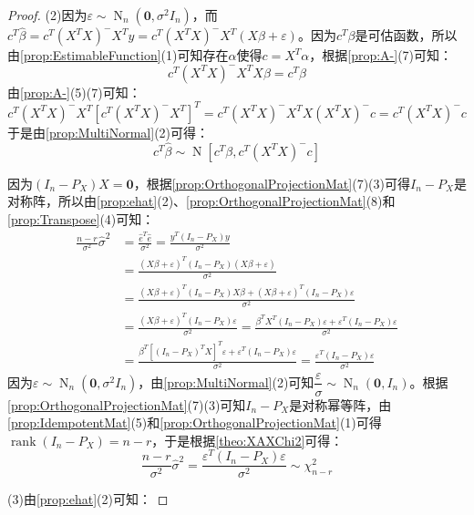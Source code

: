 \begin{proof}
	(2)因为$\varepsilon\sim\operatorname{N}_n(\mathbf{0},\sigma^2I_n)$，而$c^T\hat{\beta}=c^T(X^TX)^-X^Ty=c^T(X^TX)^-X^T(X\beta+\varepsilon)$。因为$c^T\beta$是可估函数，所以由\cref{prop:EstimableFunction}(1)可知存在$\alpha$使得$c=X^T\alpha$，根据\cref{prop:A-}(7)可知：
	\begin{equation*}
		c^T(X^TX)^-X^TX\beta=c^T\beta
	\end{equation*}
	由\cref{prop:A-}(5)(7)可知：
	\begin{equation*}
		c^T(X^TX)^-X^T[c^T(X^TX)^-X^T]^T=c^T(X^TX)^-X^TX(X^TX)^-c=c^T(X^TX)^-c
	\end{equation*}
	于是由\cref{prop:MultiNormal}(2)可得：
	\begin{equation*}
		c^T\hat{\beta}\sim\operatorname{N}[c^T\beta,c^T(X^TX)^-c]
	\end{equation*}\par
	因为$(I_n-P_X)X=\mathbf{0}$，根据\cref{prop:OrthogonalProjectionMat}(7)(3)可得$I_n-P_X$是对称阵，所以由\cref{prop:ehat}(2)、\cref{prop:OrthogonalProjectionMat}(8)和\cref{prop:Transpose}(4)可知：
	\begin{align*}
		\frac{n-r}{\sigma^2}\hat{\sigma}^2&=\frac{\hat{e}^T\hat{e}}{\sigma^2}=\frac{y^T(I_n-P_X)y}{\sigma^2} \\
		&=\frac{(X\beta+\varepsilon)^T(I_n-P_X)(X\beta+\varepsilon)}{\sigma^2} \\
		&=\frac{(X\beta+\varepsilon)^T(I_n-P_X)X\beta+(X\beta+\varepsilon)^T(I_n-P_X)\varepsilon}{\sigma^2} \\
		&=\frac{(X\beta+\varepsilon)^T(I_n-P_X)\varepsilon}{\sigma^2}=\frac{\beta^TX^T(I_n-P_X)\varepsilon+\varepsilon^T(I_n-P_X)\varepsilon}{\sigma^2} \\
		&=\frac{\beta^T[(I_n-P_X)^TX]^T\varepsilon+\varepsilon^T(I_n-P_X)\varepsilon}{\sigma^2}=\frac{\varepsilon^T(I_n-P_X)\varepsilon}{\sigma^2}
	\end{align*}
	因为$\varepsilon\sim\operatorname{N}_n(\mathbf{0},\sigma^2I_n)$，由\cref{prop:MultiNormal}(2)可知$\dfrac{\varepsilon}{\sigma}\sim\operatorname{N}_n(\mathbf{0},I_n)$。根据\cref{prop:OrthogonalProjectionMat}(7)(3)可知$I_n-P_X$是对称幂等阵，由\cref{prop:IdempotentMat}(5)和\cref{prop:OrthogonalProjectionMat}(1)可得$\operatorname{rank}(I_n-P_X)=n-r$，于是根据\cref{theo:XAXChi2}可得：
	\begin{equation*}
		\frac{n-r}{\sigma^2}\hat{\sigma}^2=\frac{\varepsilon^T(I_n-P_X)\varepsilon}{\sigma^2}\sim\chi_{n-r}^2
	\end{equation*}\par
	(3)由\cref{prop:ehat}(2)可知：

\end{proof}
